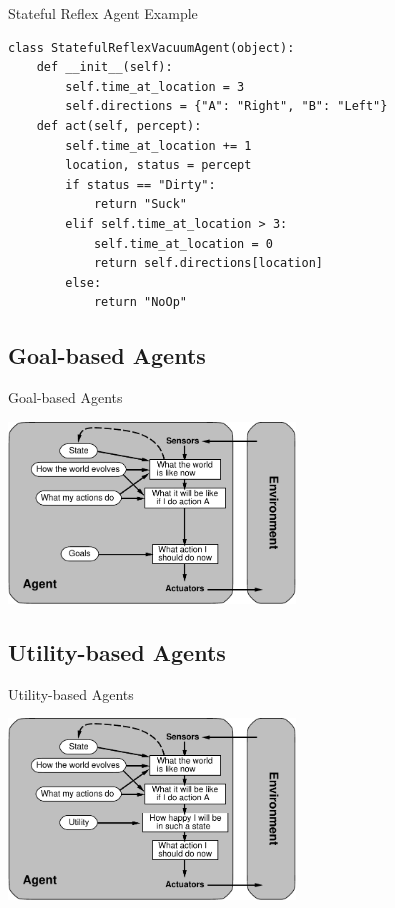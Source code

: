 \documentclass[14pt]{beamer}
\begin{document}
\begin{frame}[fragile]{Stateful Reflex Agent Example}
\footnotesize
\begin{lstlisting}
class StatefulReflexVacuumAgent(object):
    def __init__(self):
        self.time_at_location = 3
        self.directions = {"A": "Right", "B": "Left"}
    def act(self, percept):
        self.time_at_location += 1
        location, status = percept
        if status == "Dirty":
            return "Suck"
        elif self.time_at_location > 3:
            self.time_at_location = 0
            return self.directions[location]
        else:
            return "NoOp"
\end{lstlisting}
\end{frame}


\subsection{Goal-based Agents}
\begin{frame}{Goal-based Agents}
\begin{center}
\includegraphics[width=3in]{goal-based-agent.pdf}
\end{center}
\end{frame}

\subsection{Utility-based Agents}
\begin{frame}{Utility-based Agents}
\begin{center}
\includegraphics[width=3in]{utility-based-agent.pdf}
\end{center}
\end{frame}
\end{document}
